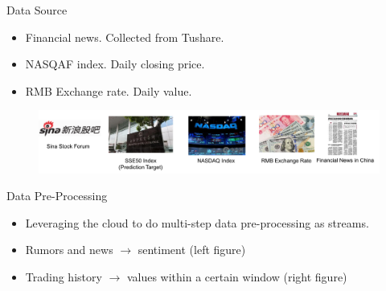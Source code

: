 \documentclass[final,hyperref={pdfpagelabels=false}]{beamer}
\begin{document}
\begin{frame}[t]
\begin{columns}[t]
\begin{column}{.445\textwidth}
\begin{block}{Data Source}
\begin{itemize}


\item Financial news. Collected from Tushare.
\item NASQAF index. Daily closing price.
\item RMB Exchange rate. Daily value.
\end{itemize}

\centering
\begin{figure}
\includegraphics[width=1.0\linewidth]{datasource.png}
\label{sample}
\end{figure}

\end{block}


\begin{block}{Data Pre-Processing}

\begin{itemize}
\item Leveraging the cloud to do multi-step data pre-processing as streams. 

\item Rumors and news $\rightarrow$ sentiment (left figure)

\item Trading history $\rightarrow$ values within a certain window (right figure)


\end{itemize}
\end{block}
\end{column}
\end{columns}
\end{frame}
\end{document}
